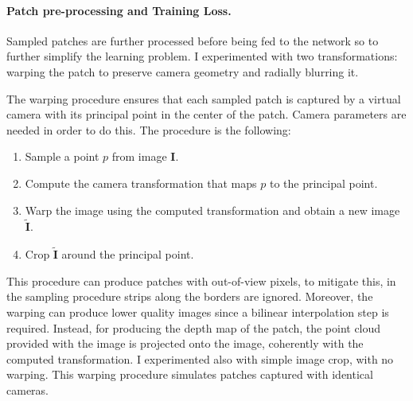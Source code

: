 \paragraph{Patch pre-processing and Training Loss.}
Sampled patches are further processed before being fed to the network so to further simplify the learning problem.
I experimented with two transformations: warping the patch to preserve camera geometry and radially blurring it.

The warping procedure ensures that each sampled patch is captured by a virtual camera with its principal point in the center of the patch.
Camera parameters are needed in order to do this.
The procedure is the following:
\begin{enumerate}
    \item{Sample a point $p$ from image $\mathbf{I}$.}
    \item{Compute the camera transformation that maps $p$ to the principal point.}
    \item{Warp the image using the computed transformation and obtain a new image $\tilde{\mathbf{I}}$.}
    \item{Crop $\tilde{\mathbf{I}}$ around the principal point.}
\end{enumerate}
This procedure can produce patches with out-of-view pixels, to mitigate this, in the sampling procedure strips along the borders are ignored.
Moreover, the warping can produce lower quality images since a bilinear interpolation step is required.
Instead, for producing the depth map of the patch, the point cloud provided with the image is projected onto the image, coherently with the computed transformation.
I experimented also with simple image crop, with no warping.
This warping procedure simulates patches captured with identical cameras.

